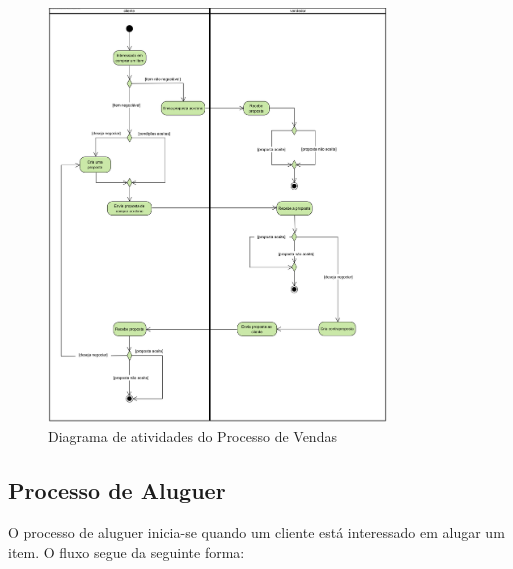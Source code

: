 \documentclass[a4paper, 12pt]{article} %
\begin{document}
\begin{figure}[ht]
	\centering
	\includegraphics[width=0.8\textwidth]{../images/activity-diagram-sales.png}
	\caption{Diagrama de atividades do Processo de Vendas}
	\label{fig:diagrama_atividades_vendas}
\end{figure}
\newpage
\clearpage

\subsection{Processo de Aluguer}
O processo de aluguer inicia-se quando um cliente está interessado em alugar um item. O fluxo segue da seguinte forma:
\end{document}
